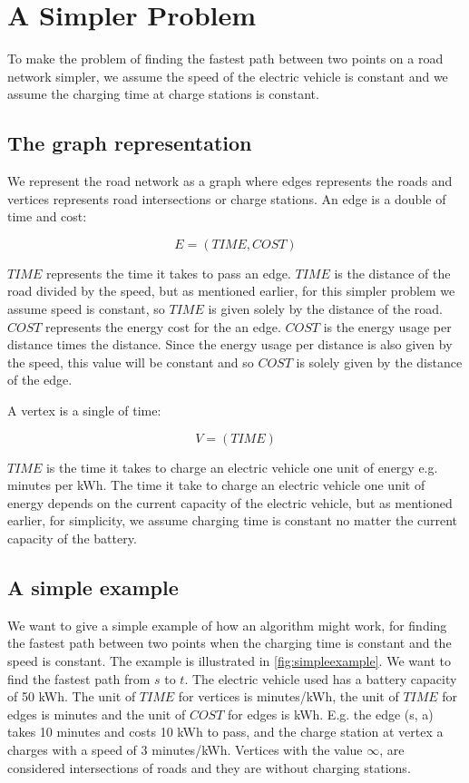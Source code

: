 \section{A Simpler Problem}

To make the problem of finding the fastest path between two points on a road network simpler, 
we assume the speed of the electric vehicle is constant and we assume the charging time at
charge stations is constant. 

\subsection{The graph representation}
We represent the road network as a graph where edges represents the roads and vertices represents
road intersections or charge stations. An edge is a double of time and cost:

\[E = (\textit{TIME}, \textit{COST}) \]

$\textit{TIME}$ represents the time it takes to pass an edge. $\textit{TIME}$ is the distance of
the road divided by the speed, but as mentioned earlier, for this simpler problem we assume
speed is constant, so $\textit{TIME}$ is given solely by the distance of the road. $\textit{COST}$ 
represents the energy cost for the an edge. $\textit{COST}$ is the energy usage per distance 
times the distance. Since the energy usage per distance is also given by the speed, this value
will be constant and so $\textit{COST}$ is solely given by the distance of the edge.

A vertex is a single of time: 
 
\[V = (\textit{TIME})\]

$\textit{TIME}$ is the time it takes to charge an electric vehicle one unit of energy e.g. minutes 
per kWh. The time it take to charge an electric vehicle one unit of energy depends on the current
capacity of the electric vehicle, but as mentioned earlier, for simplicity, we assume charging 
time is constant no matter the current capacity of the battery.

\subsection{A simple example}

We want to give a simple example of how an algorithm might work, for finding the fastest path 
between two points when the charging time is constant and the speed is constant. The example is
illustrated in \ref{fig:simpleexample}. We want to find the fastest path from $s$ to $t$. The
electric vehicle used has a battery capacity of 50 kWh. The unit of $\textit{TIME}$ for vertices
is minutes/kWh, the unit of $\textit{TIME}$ for edges is minutes and the unit of $\textit{COST}$
for edges is kWh. E.g. the edge (s, a) takes 10 minutes and costs 10 kWh to pass, and the charge
station at vertex a charges with a speed of 3 minutes/kWh. Vertices with the value $\infty$, are
considered intersections of roads and they are without charging stations.

